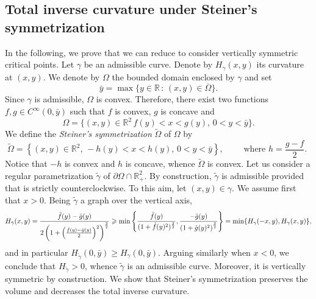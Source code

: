 \documentclass[11pt]{amsart}
\renewcommand{\geq}{\geqslant}
\newcommand{\rr}{{\mathbb{R}}}
\newcommand{\Om}{\Omega}
\theoremstyle{definition}
\theoremstyle{remark}
\numberwithin{equation}{section}
\begin{document}
	\subsection{Total inverse curvature under Steiner's symmetrization}\label{sec_steiner}
	In the following, we prove that we can reduce to consider vertically symmetric critical points. 
	Let $\gamma$ be an admissible curve. Denote by $H_\gamma(x,y)$ its curvature at $(x,y)$. We denote by $\Om$ the bounded domain enclosed by $\gamma$ and set $$\bar y=\max\{y\in\rr\,:\,(x,y)\in\overline \Om\}.$$ Since $\gamma$ is admissible, $\Om$ is convex. Therefore, there exist two functions $f,g\in C^{\infty}(0,\bar y)$ such that $f$ is convex, $g$ is concave and 
	\begin{equation*}
		\Om=\{(x,y)\in\rr^2\,f(y)< x< g(y),\,0<y<\bar y\}.
	\end{equation*}
	We define the \emph{Steiner's symmetrization} $\tilde\Om$ of $\Om$ by
	\begin{equation*}
		\tilde\Om=\left\{(x,y)\in\rr^2,\,-h(y)< x< h(y),\,0<y<\bar y\right\},\qquad\text{ where $h=\frac{g-f}{2}$. }
	\end{equation*}
	Notice that $-h$ is convex and $h$ is concave, whence $\tilde\Om$ is convex. Let us consider a regular parametrization $\tilde\gamma$ of $\partial\Om\cap\rr^2_+$. By construction, $\tilde\gamma$ is admissible provided that is strictly counterclockwise. 
	To this aim, let $(x,y)\in\gamma$. We assume first that $x>0$. Being $\tilde \gamma$ a graph over the vertical axis, 
	\begin{equation*}
		H_{\tilde \gamma}(x,y)=\frac{\Ddot f(y)-\Ddot g(y)}{2\left(1+\left(\frac{\Dot f(y)-\Dot g(y)}{2}\right)^2\right)^{\frac{3}{2}}}\geq\min\left\{  \frac{\Ddot f(y)}{(1+\Dot f(y)^2)^{\frac{3}{2}}},\frac{-\Ddot g(y)}{\left(1+\Dot g(y)^2\right)^{\frac{3}{2}}}\right\}=\min\{H_{\gamma}(-x,y),H_{\gamma}(x,y)\},
	\end{equation*}
	and in particular $H_{\tilde \gamma}(0,\bar y)\geq H_\gamma(0,\bar y)$.
	Arguing similarly when $x<0$, we conclude that $H_{\tilde\gamma}>0$, whence $\tilde\gamma$ is an admissible curve. Moreover, it is vertically symmetric by construction.
	We show that Steiner's symmetrization preserves the volume and decreases the total inverse curvature.
	
\end{document}
